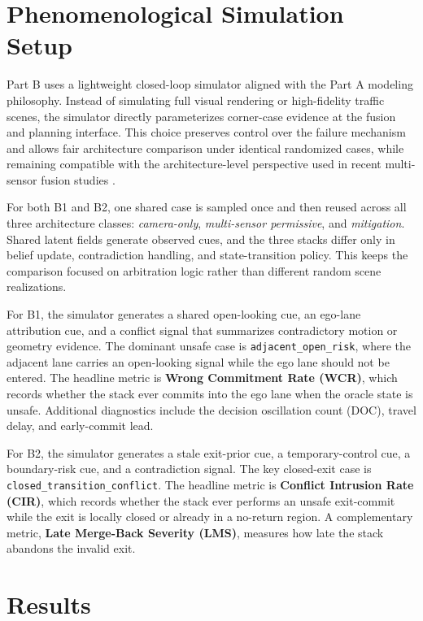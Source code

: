 \documentclass[sigconf,nonacm]{acmart}
\begin{document}
\section{Phenomenological Simulation Setup}

Part B uses a lightweight closed-loop simulator aligned with the Part A modeling philosophy. Instead of simulating full visual rendering or high-fidelity traffic scenes, the simulator directly parameterizes corner-case evidence at the fusion and planning interface. This choice preserves control over the failure mechanism and allows fair architecture comparison under identical randomized cases, while remaining compatible with the architecture-level perspective used in recent multi-sensor fusion studies \cite{huang2022survey,centerfusion2020,transfuser2021,bevfusion2022,umoe2023}.

For both B1 and B2, one shared case is sampled once and then reused across all three architecture classes: \emph{camera-only}, \emph{multi-sensor permissive}, and \emph{mitigation}. Shared latent fields generate observed cues, and the three stacks differ only in belief update, contradiction handling, and state-transition policy. This keeps the comparison focused on arbitration logic rather than different random scene realizations.

For B1, the simulator generates a shared open-looking cue, an ego-lane attribution cue, and a conflict signal that summarizes contradictory motion or geometry evidence. The dominant unsafe case is \texttt{adjacent\_open\_risk}, where the adjacent lane carries an open-looking signal while the ego lane should not be entered. The headline metric is \textbf{Wrong Commitment Rate (WCR)}, which records whether the stack ever commits into the ego lane when the oracle state is unsafe. Additional diagnostics include the decision oscillation count (DOC), travel delay, and early-commit lead.

For B2, the simulator generates a stale exit-prior cue, a temporary-control cue, a boundary-risk cue, and a contradiction signal. The key closed-exit case is \texttt{closed\_transition\_conflict}. The headline metric is \textbf{Conflict Intrusion Rate (CIR)}, which records whether the stack ever performs an unsafe exit-commit while the exit is locally closed or already in a no-return region. A complementary metric, \textbf{Late Merge-Back Severity (LMS)}, measures how late the stack abandons the invalid exit.

\section{Results}
\end{document}
